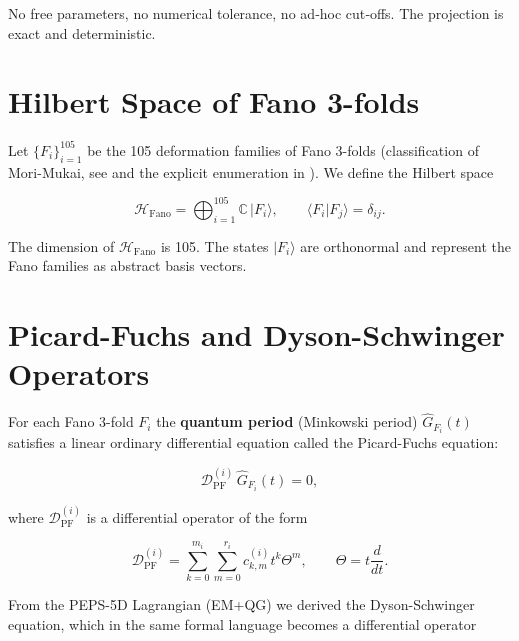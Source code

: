 \documentclass[12pt]{article}
\begin{document}
No free parameters, no numerical tolerance, no ad‑hoc cut‑offs. The projection
is exact and deterministic.

\section{Hilbert Space of Fano 3-folds}

Let \(\{F_i\}_{i=1}^{105}\) be the 105 deformation families of Fano 3-folds
(classification of Mori-Mukai, see \cite{mori1981,mori1986} and the
explicit enumeration in \cite{coates2013}). We define the Hilbert space

\begin{equation}
\mathcal{H}_{\text{Fano}} = \bigoplus_{i=1}^{105} \mathbb{C} \, |F_i\rangle,
\qquad \langle F_i | F_j \rangle = \delta_{ij}.
\label{eq:hilbert}
\end{equation}

The dimension of \(\mathcal{H}_{\text{Fano}}\) is 105. The states \(|F_i\rangle\)
are orthonormal and represent the Fano families as abstract basis vectors.

\section{Picard-Fuchs and Dyson-Schwinger Operators}

For each Fano 3-fold \(F_i\) the \textbf{quantum period} (Minkowski period)
\(\widehat{G}_{F_i}(t)\) satisfies a linear ordinary differential equation
called the Picard-Fuchs equation:

\begin{equation}
\mathcal{D}_{\text{PF}}^{(i)} \,\widehat{G}_{F_i}(t) = 0,
\label{eq:pf}
\end{equation}

where \(\mathcal{D}_{\text{PF}}^{(i)}\) is a differential operator of the form

\begin{equation}
\mathcal{D}_{\text{PF}}^{(i)} = \sum_{k=0}^{m_i} \sum_{m=0}^{r_i} c_{k,m}^{(i)} t^k \Theta^m,
\qquad \Theta = t\frac{d}{dt}.
\label{eq:pf_operator}
\end{equation}

From the PEPS-5D Lagrangian (EM+QG) we derived the Dyson-Schwinger equation,
which in the same formal language becomes a differential operator
\end{document}
